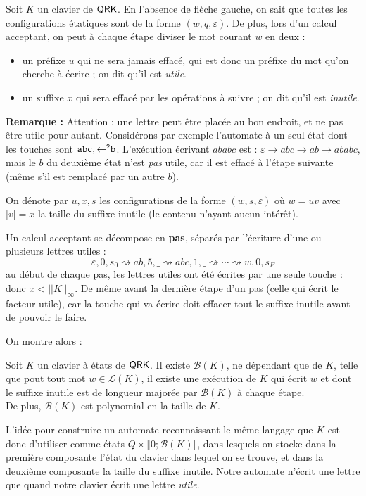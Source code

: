 \documentclass[12pt, a4paper]{article}
\renewcommand{\L}{\mathcal{L}}
\newcommand{\Kinf}{||K||_{\infty}}
\begin{document}
    Soit $K$ un clavier de $\mathsf{QRK}$. En l'absence de flèche gauche, on sait que toutes les configurations étatiques sont de la forme $(w,q,\varepsilon)$. De plus, lors d'un calcul acceptant, on peut à chaque étape diviser le mot courant $w$ en deux :
    \begin{itemize}
        \item un préfixe $u$ qui ne sera jamais effacé, qui est donc un préfixe du mot qu'on cherche à écrire ; on dit qu'il est \emph{utile}.
        \item un suffixe $x$ qui sera effacé par les opérations à suivre ; on dit qu'il est \emph{inutile}.
    \end{itemize}
    \textbf{Remarque :} Attention : une lettre peut être placée au bon endroit, et ne pas être utile pour autant. Considérons par exemple l'automate à un seul état dont les touches sont $\mathtt{abc},\mathtt{\mathord{\leftarrow}^2b}$. 
    L'exécution écrivant $ababc$ est : $\varepsilon \rightarrow abc \rightarrow ab \rightarrow ababc$, mais le $b$ du deuxième état n'est \emph{pas} utile, car il est effacé à l'étape suivante (même s'il est remplacé par un autre $b$). \smallskip

    On dénote par $u,x,s$ les configurations de la forme $(w,s,\varepsilon)$ où $w = uv$ avec $|v| = x$ la taille du suffixe inutile (le contenu n'ayant aucun intérêt).
    \begin{pas}
        Un calcul acceptant se décompose en \textbf{pas}, séparés par l'écriture d'une ou plusieurs lettres utiles :
        \[ \varepsilon,0,s_0 \rightsquigarrow ab,5,\_ \rightsquigarrow abc,1,\_ \rightsquigarrow \cdots \rightsquigarrow w,0,s_F \]
        au début de chaque pas, les lettres utiles ont été écrites par une seule touche : donc $x < \Kinf$. De même avant la dernière étape d'un pas (celle qui écrit le facteur utile), car la touche qui va écrire doit effacer tout le suffixe inutile avant de pouvoir le faire.
    \end{pas}


    On montre alors :
    \begin{inutilesbornés}\label{bk}
        Soit $K$ un clavier à états de $\mathsf{QRK}$. Il existe $\mathcal{B}(K)$, ne dépendant que de $K$, telle que pout tout mot $w \in \L(K)$,
        il existe une exécution de $K$ qui écrit $w$ et dont le suffixe inutile est de longueur majorée par $\mathcal{B}(K)$ à chaque étape. \\
        De plus, $\mathcal{B}(K)$ est polynomial en la taille de $K$.
    \end{inutilesbornés}
    L'idée pour construire un automate reconnaissant le même langage que $K$ est donc d'utiliser comme états $Q \times \llbracket 0 ; \mathcal{B}(K) \rrbracket$, dans lesquels on stocke dans la première composante l'état du clavier dans lequel on se trouve,
    et dans la deuxième composante la taille du suffixe inutile. Notre automate n'écrit une lettre que quand notre clavier écrit une lettre \emph{utile}.
    
\end{document}
